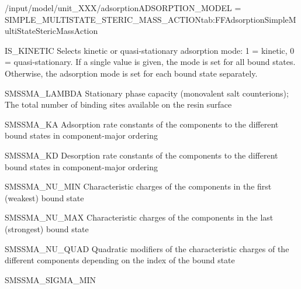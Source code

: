 \begin{condsubgroup}{/input/model/unit\_XXX/adsorption}{ADSORPTION\_MODEL = SIMPLE\_MULTISTATE\_STERIC\_MASS\_ACTION}{tab:FFAdsorptionSimpleMultiStateStericMassAction}
\begin{dataset}[type=int,range={$\{ 0,1 \}$},length={1 / \texttt{NTOTALBND}}]{IS\_KINETIC}
    Selects kinetic or quasi-stationary adsorption mode: 1 = kinetic, 0 = quasi-stationary.
    If a single value is given, the mode is set for all bound states.
    Otherwise, the adsorption mode is set for each bound state separately.
  \end{dataset}
  \begin{dataset}[unit=\si{\mol\per\cubic\metre\of{SP}}, type = double, range={$\geq 0$}, length={1}]{SMSSMA\_LAMBDA} 
    Stationary phase capacity (monovalent salt counterions); The total number of binding sites available on the resin surface
  \end{dataset}
  \begin{dataset}[unit=\si{\raiseto{3}\metre\of{MP}\per\raiseto{3}\metre\of{SP}\per\second} , type = double, range={$\geq 0$}, length={\texttt{NTOTALBND}}]{SMSSMA\_KA} 
    Adsorption rate constants of the components to the different bound states in component-major ordering
  \end{dataset} 
  \begin{dataset}[unit=\si{\per\second}, type = double, range={$\geq 0$}, length={\texttt{NTOTALBND}}]{SMSSMA\_KD} 
    Desorption rate constants of the components to the different bound states in component-major ordering
  \end{dataset} 
  \begin{dataset}[type = double, range={$\geq 0$}, length={\texttt{NCOMP}}]{SMSSMA\_NU\_MIN} 
    Characteristic charges of the components in the first (weakest) bound state
  \end{dataset} 
  \begin{dataset}[type = double, range={$\geq 0$}, length={\texttt{NCOMP}}]{SMSSMA\_NU\_MAX} 
    Characteristic charges of the components in the last (strongest) bound state
  \end{dataset} 
  \begin{dataset}[type = double, range={$\mathds{R}$}, length={\texttt{NCOMP}}]{SMSSMA\_NU\_QUAD} 
    Quadratic modifiers of the characteristic charges of the different components depending on the index of the bound state
  \end{dataset} 
  \begin{dataset}[type = double, range={$\geq 0$}, length={\texttt{NCOMP}}]{SMSSMA\_SIGMA\_MIN} 

\end{dataset}
\end{condsubgroup}
